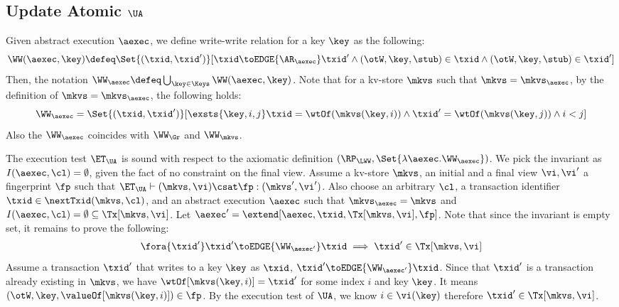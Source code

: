 \subsection{Update Atomic \( \UA \)}
\label{sec:sound-complete-ua}

Given abstract execution \( \aexec \), we define write-write relation for a key \( \key \) as the following:
\[ 
    \WW(\aexec,\key) \defeq \Set{(\txid, \txid')}[\txid \toEDGE{\AR_\aexec} \txid' \land (\otW,\key, \stub ) \in \txid \land (\otW,\key, \stub ) \in \txid' ]
\]
Then, the notation \( \WW_\aexec \defeq \bigcup_{\key \in \Keys} \WW(\aexec, \key) \).
Note that for a kv-store \( \mkvs \) such that \( \mkvs = \mkvs_\aexec \),
by the definition of  \(  \mkvs = \mkvs_\aexec \), 
the following holds:
\[
    \WW_\aexec = \Set{(\txid, \txid')}[\exsts{\key, i,j } \txid = \wtOf(\mkvs(\key, i)) \land \txid' = \wtOf(\mkvs(\key, j)) \land i < j]
\]
Also the \( \WW_\aexec \) coincides with \( \WW_\Gr \) and \( \WW_\mkvs \).

The execution test $\ET_\UA$ is sound with respect to the axiomatic definition \( (\RP_{\LWW}, \Set{\lambda \aexec. \WW_\aexec }) \).
We pick the invariant as \( I( \aexec, \cl ) = \emptyset \), given the fact of no constraint on the final view.
Assume a kv-store $\mkvs$, an initial and a final view $\vi, \vi'$  a fingerprint $\fp$ 
such that $\ET_{\UA} \vdash (\mkvs, \vi) \csat \fp: (\mkvs', \vi')$. 
Also choose an arbitrary $\cl$, a transaction identifier $\txid \in \nextTxid(\mkvs, \cl)$, 
and an abstract execution $\aexec$ such that $\mkvs_{\aexec} = \mkvs$ and 
\( I(\aexec, \cl) =  \emptyset \subseteq \Tx[\mkvs, \vi] \).
Let \( \aexec' = \extend[\aexec, \txid, \Tx[\mkvs, \vi], \fp] \).
Note that since the invariant is empty set, it remains to prove the following:
\[
    \begin{array}{@{}l@{}}
        \fora{ \txid' } \txid' \toEDGE{\WW_{\aexec'}} \txid \implies \txid' \in \Tx[\mkvs, \vi]
    \end{array}
\]
Assume a transaction \( \txid' \) that writes to a key \( \key \) as \( \txid \), \ie \( \txid' \toEDGE{\WW_{\aexec'}} \txid \).
Since that \( \txid' \) is a transaction already existing in \( \mkvs\),
we have \( \wtOf[\mkvs(\key, i)] = \txid' \) for some index \( i \) and key \( \key \).
It means \( (\otW, \key, \valueOf[\mkvs(\key, i)]) \in \fp \).
By the execution test of \( \UA \), we know \( i \in \vi(\key) \) therefore \( \txid' \in \Tx[\mkvs, \vi] \).

